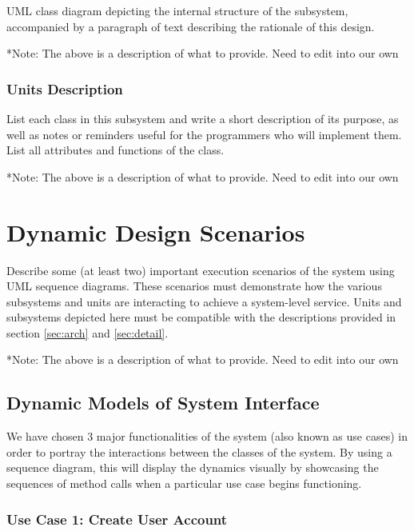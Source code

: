 \documentclass[12pt]{article}
\begin{document}
UML class diagram depicting the internal structure of the subsystem,
accompanied by a paragraph of text describing the rationale of this design.

*Note: The above is a description of what to provide. Need to edit into our own




\subsubsection{Units Description}

List each class in this subsystem and write a short description of its purpose,
as well as notes or reminders useful for the programmers who will implement them.
List all attributes and functions of the class.

*Note: The above is a description of what to provide. Need to edit into our own

\section{Dynamic Design Scenarios} \label{Dynamic Models}

Describe some (at least two) important execution scenarios of the system using UML sequence diagrams.
These scenarios must demonstrate how the various subsystems and units are interacting to achieve a system-level service.
Units and subsystems depicted here must be compatible with the descriptions provided in
section \ref{sec:arch} and \ref{sec:detail}.

*Note: The above is a description of what to provide. Need to edit into our own


\subsection{Dynamic Models of System Interface}

We have chosen 3 major functionalities of the system (also known as use cases) in order to portray the interactions between the classes of the system. By using a sequence diagram, this will display the dynamics visually by showcasing the sequences of method calls when a particular use case begins functioning.

\clearpage

\subsubsection{Use Case 1: Create User Account}
\end{document}
